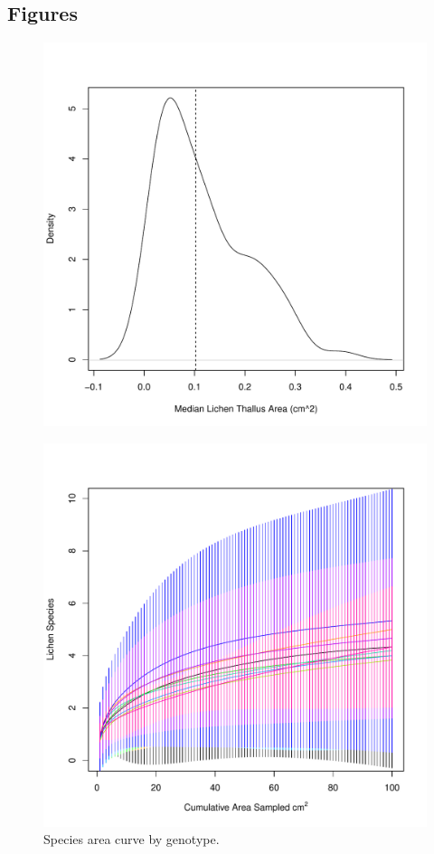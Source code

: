 \documentclass[11pt,twocolumn,twoside,lineno]{pnas-new}
\begin{document}
\newpage


\newpage


\newpage
\subsection*{Figures}

\begin{figure}[ht]
\centering
\includegraphics[width=\linewidth]{xg_size.pdf}
\caption{}
\label{fig:xg_size_app}
\end{figure}

\begin{figure}[ht]
\centering
\includegraphics[width=\linewidth]{spac_geno.pdf}
\caption{Species area curve by genotype.}
\label{fig:spac_geno_app}
\end{figure}
\end{document}
